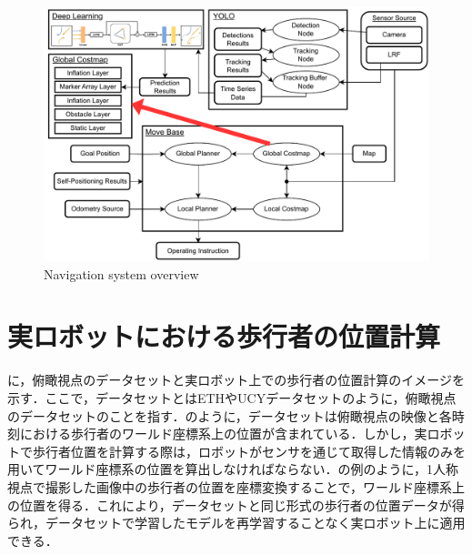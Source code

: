 \begin{figure}[H]
  \centering
 \includegraphics[keepaspectratio, scale=0.77]
      {images/application_system.pdf}
 \caption{Navigation system overview}
 \label{Fig:nav-system}
\end{figure}

\vspace{-30pt}

\section{実ロボットにおける歩行者の位置計算}\label{sec:real-robot}
に，俯瞰視点のデータセットと実ロボット上での歩行者の位置計算のイメージを示す．ここで，データセットとはETH\cite{pellegrini2009you-eth}やUCY\cite{lerner2007crowds-ucy}データセットのように，俯瞰視点のデータセットのことを指す．のように，データセットは俯瞰視点の映像と各時刻における歩行者のワールド座標系上の位置が含まれている．しかし，実ロボットで歩行者位置を計算する際は，ロボットがセンサを通じて取得した情報のみを用いてワールド座標系の位置を算出しなければならない．の例のように，1人称視点で撮影した画像中の歩行者の位置を座標変換することで，ワールド座標系上の位置を得る．これにより，データセットと同じ形式の歩行者の位置データが得られ，データセットで学習したモデルを再学習することなく実ロボット上に適用できる．

